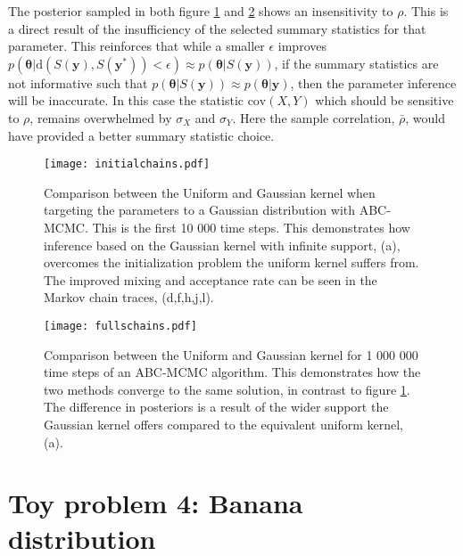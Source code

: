 The posterior sampled in both figure \ref{KuVSKg-1} and \ref{KuVSKg-2} shows an insensitivity to $\rho$. This is a direct result of the insufficiency of the selected summary statistics for that parameter. This reinforces that while a smaller $\epsilon$ improves $p(\bm{\theta}|\text{d}(S(\bm{y}),S(\bm{y^*}))<\epsilon) \approx p(\bm{\theta}|S(\bm{y}))$, if the summary statistics are not informative such that $p(\bm{\theta}|S(\bm{y})) \approx p(\bm{\theta}|\bm{y})$, then the parameter inference will be inaccurate. In this case the statistic $\text{cov}(X,Y)$ which should be sensitive to $\rho$, remains overwhelmed by $\sigma_X$ and $\sigma_Y$. Here the sample correlation, $\bar{\rho}$, would have provided a better summary statistic choice. 

\begin{figure}[H]
	\centering
	\texttt{[image: initialchains.pdf]}
	\caption{Comparison between the Uniform and Gaussian kernel when targeting the parameters to a Gaussian distribution with ABC-MCMC. This is the first 10 000 time steps. This demonstrates how inference based on the Gaussian kernel with infinite support, (a), overcomes the initialization problem the uniform kernel suffers from. The improved mixing and acceptance rate can be seen in the Markov chain traces, (d,f,h,j,l).}
	\label{KuVSKg-1}
\end{figure}

\begin{figure}[H]
	\centering
	\texttt{[image: fullschains.pdf]}
	\caption{Comparison between the Uniform and Gaussian kernel for 1 000 000 time steps of an ABC-MCMC algorithm. This demonstrates how the two methods converge to the same solution, in contrast to figure \ref{KuVSKg-1}. The difference in posteriors is a result of the wider support the Gaussian kernel offers compared to the equivalent uniform kernel, (a).}
	\label{KuVSKg-2}
\end{figure} 

\section{Toy problem 4: Banana distribution}
\label{banana-section}

